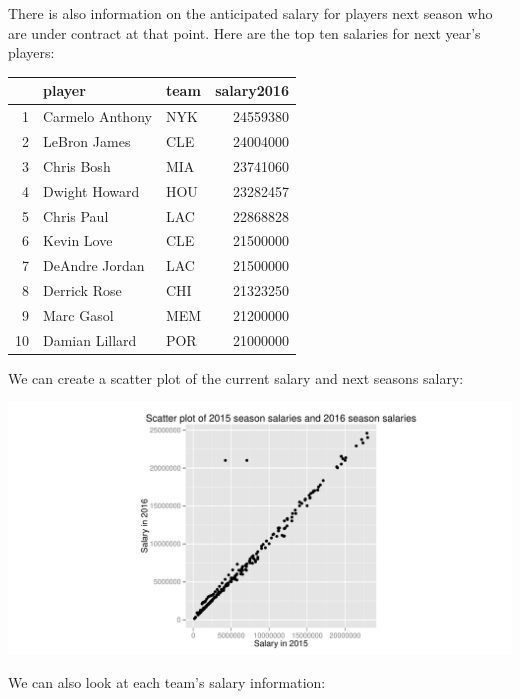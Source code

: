 \documentclass[11pt]{article}\usepackage[]{graphicx}\usepackage[]{color}
\makeatletter
\def\maxwidth{ %
  \ifdim\Gin@nat@width>\linewidth
    \linewidth
  \else
    \Gin@nat@width
  \fi
}
\newenvironment{knitrout}{}{} %
\makeatother
\begin{document}
There is also information on the anticipated salary for players next season who are under contract at that point. Here are the top ten salaries for next year's players:
\begin{table}[ht]
\centering
\begin{tabular}{rllr}
  \hline
 & player & team & salary2016 \\ 
  \hline
1 & Carmelo Anthony & NYK & 24559380 \\ 
  2 & LeBron James & CLE & 24004000 \\ 
  3 & Chris Bosh & MIA & 23741060 \\ 
  4 & Dwight Howard & HOU & 23282457 \\ 
  5 & Chris Paul & LAC & 22868828 \\ 
  6 & Kevin Love & CLE & 21500000 \\ 
  7 & DeAndre Jordan & LAC & 21500000 \\ 
  8 & Derrick Rose & CHI & 21323250 \\ 
  9 & Marc Gasol & MEM & 21200000 \\ 
  10 & Damian Lillard & POR & 21000000 \\ 
   \hline
\end{tabular}
\end{table}

We can create a scatter plot of the current salary and next seasons salary:

\begin{knitrout}
\color{fgcolor}
\includegraphics[width=\maxwidth]{figure/unnamed-chunk-5-1} 

\end{knitrout}

We can also look at each team's salary information: 
\end{document}
